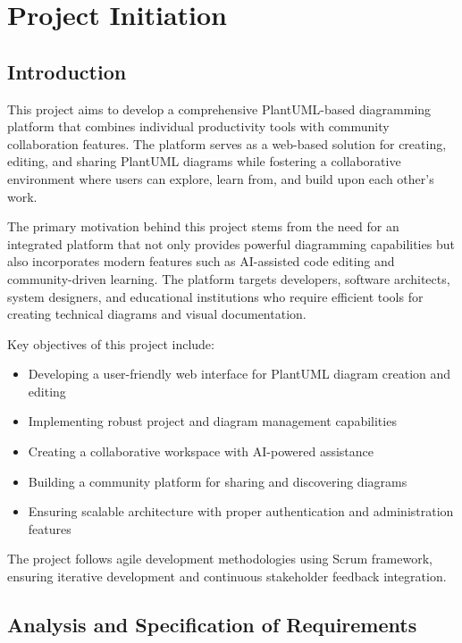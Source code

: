 
\chapter{Project Initiation}

\section{Introduction}

This project aims to develop a comprehensive PlantUML-based diagramming platform that combines individual productivity tools with community collaboration features. The platform serves as a web-based solution for creating, editing, and sharing PlantUML diagrams while fostering a collaborative environment where users can explore, learn from, and build upon each other's work.

The primary motivation behind this project stems from the need for an integrated platform that not only provides powerful diagramming capabilities but also incorporates modern features such as AI-assisted code editing and community-driven learning. The platform targets developers, software architects, system designers, and educational institutions who require efficient tools for creating technical diagrams and visual documentation.

Key objectives of this project include:
\begin{itemize}
    \item Developing a user-friendly web interface for PlantUML diagram creation and editing
    \item Implementing robust project and diagram management capabilities
    \item Creating a collaborative workspace with AI-powered assistance
    \item Building a community platform for sharing and discovering diagrams
    \item Ensuring scalable architecture with proper authentication and administration features
\end{itemize}

The project follows agile development methodologies using Scrum framework, ensuring iterative development and continuous stakeholder feedback integration.

\section{Analysis and Specification of Requirements}

